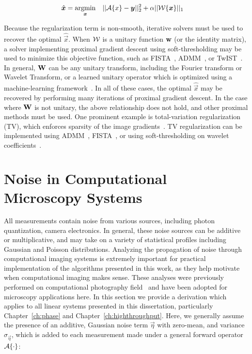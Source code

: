 \begin{equation}\label{eq:intro_sparse}
\begin{aligned}
& \hat{\bm{x}} = \underset{\bm{x}}{\text{argmin}}
& & ||\mathcal{A}\{x\}-\bm{y} ||_2^2 + \alpha||\mathcal{W}\{\bm{x}\}||_1
\end{aligned}
\end{equation}

Because the regularization term is non-smooth, iterative solvers must be used to recover the optimal $\hat{\vec{x}}$. When $\mathcal{W}$ is a unitary function $\mathbf{w}$ (or the identity matrix), a solver implementing proximal gradient descent using soft-thresholding may be used to minimize this objective function, such as FISTA~\cite{beck2009fast}, ADMM~\cite{boyd2011distributed}, or TwIST~\cite{bioucas2007new}. In general, $\mathbf{W}$ can be any unitary transform, including the Fourier transform  or Wavelet Transform, or a learned unitary operator which is optimized using a machine-learning framework~\cite{ravishankar2013learning}. In all of these cases, the optimal $\hat{\vec{x}}$ may be recovered by performing many iterations of proximal gradient descent. In the case where $\mathbf{W}$ is not unitary, the above relationship does not hold, and other proximal methods must be used. One prominent example is total-variation regularization (TV), which enforces sparsity of the image gradients~\cite{rudin1992nonlinear}. TV regularization can be implemented using ADMM~\cite{wahlberg2012admm}, FISTA~\cite{beck2009fast}, or using soft-thresholding on wavelet coefficients~\cite{kamilov2012wavelet}.

\section{Noise in Computational Microscopy Systems}\label{sec:intro_noise}
All measurements contain noise from various sources, including photon quantization, camera electronics. In general, these noise sources can be additive or multiplicative, and may take on a variety of statistical profiles including Gaussian and Poisson distributions. Analyzing the propagation of noise through computational imaging systems is extremely important for practical implementation of the algorithms presented in this work, as they help motivate when computational imaging makes sense. These analyses were previously performed on computational photography field~\cite{cossairt2013does} and have been adopted for microscopy applications here. In this section we provide a derivation which applies to all linear systems presented in this dissertation, particularly Chapter~\ref{ch:phase} and Chapter~\ref{ch:highthroughput}. Here, we generally assume the presence of an additive, Gaussian noise term $\vec{\eta}$ with zero-mean, and variance $\sigma_{\vec{\eta}}$, which is added to each measurement made under a general forward operator $\mathcal{A}\{\cdot\}$:

